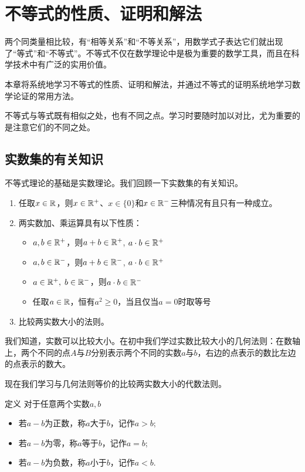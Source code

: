 \chapter{不等式的性质、证明和解法}
两个同类量相比较，有“相等关系”和“不等关系”，用数学式子表达它们就出现了“等式”和“不等式”。不等式不仅在数学理论中是极为重要的数学工具，而且在科学技术中有广泛的实用价值。

本章将系统地学习不等式的性质、证明和解法，并通过不等式的证明系统地学习数学论证的常用方法。

不等式与等式既有相似之处，也有不同之点。学习时要随时加以对比，尤为重要的是注意它们的不同之处。

\section{实数集的有关知识}

不等式理论的基础是实数理论。我们回顾一下实数集的有关知识。

\begin{enumerate}
    \item 任取$x\in\mathbb{R}$，则$x\in\mathbb{R}^+$、$x\in\{0\}$和$x\in \mathbb{R}^-$三种情况有且只有一种成立。
    \item 两实数加、乘运算具有以下性质：
    \begin{itemize}
        \item $a,b\in \mathbb{R}^+$，则$a+b\in\mathbb{R}^+$, $a\cdot b\in\mathbb{R}^+$
        \item $a,b\in \mathbb{R}^-$，则$a+b\in\mathbb{R}^-$, $a\cdot b\in\mathbb{R}^+$
        \item $a\in\mathbb{R}^+,\; b\in \mathbb{R}^-$，则$a\cdot b\in\mathbb{R}^-$
        \item 任取$a\in\mathbb{R}$，恒有$a^2\ge 0$，当且仅当$a=0$时取等号
    \end{itemize}
    \item 比较两实数大小的法则。
\end{enumerate}

我们知道，实数可以比较大小。在初中我们学过实数比较大小的几何法则：在数轴上，两个不同的点$A$与$B$分别表示两个不同的实数$a$与$b$，右边的点表示的数比左边的点表示的数大。

现在我们学习与几何法则等价的比较两实数大小的代数法则。

\begin{thm}{定义}
对于任意两个实数$a,b$
\begin{itemize}
    \item 若$a-b$为正数，称$a$大于$b$，记作$a>b$;
    \item 若$a-b$为零，称$a$等于$b$，记作$a=b$;
    \item 若$a-b$为负数，称$a$小于$b$，记作$a<b$.
\end{itemize}
\end{thm}

